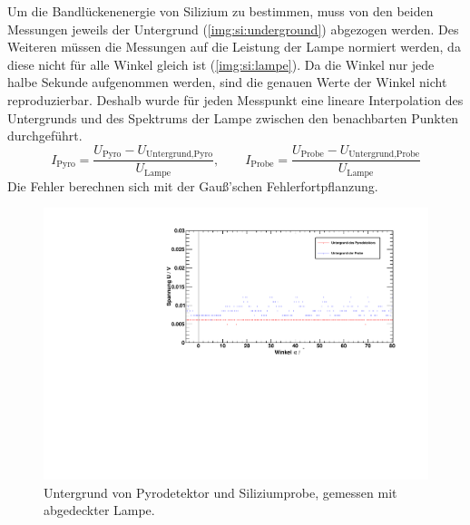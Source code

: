 Um die Bandlückenenergie von Silizium zu bestimmen, muss von den beiden Messungen jeweils der Untergrund (\autoref{img:si:underground}) abgezogen 
werden. Des Weiteren müssen die Messungen auf die Leistung der Lampe normiert werden, da diese nicht für alle Winkel gleich ist 
(\autoref{img:si:lampe}). Da die Winkel nur jede halbe Sekunde aufgenommen werden, sind die genauen Werte der Winkel nicht reproduzierbar. 
Deshalb wurde für jeden Messpunkt eine lineare Interpolation des Untergrunds und des Spektrums der Lampe zwischen den benachbarten Punkten 
durchgeführt.
\begin{equation}
  I_{\text{Pyro}} = \frac{U_{\text{Pyro}} - U_{\text{Untergrund,Pyro}}}{U_{\text{Lampe}}}, \qquad I_{\text{Probe}} = \frac{U_{\text{Probe}} - U_{\text{Untergrund,Probe}}}{U_{\text{Lampe}}}
\end{equation}
Die Fehler berechnen sich mit der Gauß'schen Fehlerfortpflanzung.

\begin{figure}[H]
\begin{center}
  \includegraphics[width=\textwidth]{../img/part1/Si_Untergrund_spectrum.pdf}
  \caption{Untergrund von Pyrodetektor und Siliziumprobe, gemessen mit abgedeckter Lampe.}
  \label{img:si:underground}
\end{center}
\end{figure}

